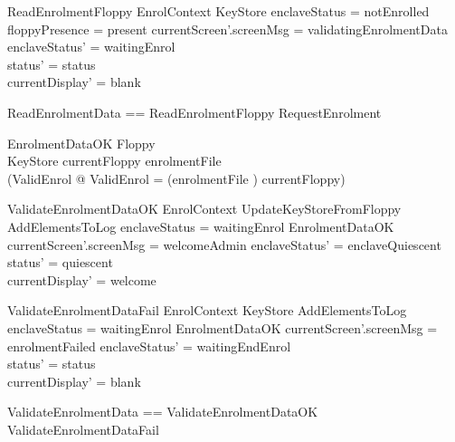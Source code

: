 \begin{schema}{ReadEnrolmentFloppy}
        EnrolContext
\also
        \Xi KeyStore
\where
        enclaveStatus = notEnrolled
\\      floppyPresence = present
\also
        currentScreen'.screenMsg = validatingEnrolmentData 
\also
        enclaveStatus' = waitingEnrol     
\\      status' = status
\\      currentDisplay' = blank                         
\end{schema}

\begin{zed}
        ReadEnrolmentData == ReadEnrolmentFloppy \lor RequestEnrolment
\end{zed}

\begin{schema}{EnrolmentDataOK}
        Floppy
\\      KeyStore
\where
        currentFloppy \in \ran enrolmentFile
\\      (\exists ValidEnrol @ \theta ValidEnrol = (enrolmentFile \inv)
currentFloppy)
\end{schema}

\begin{schema}{ValidateEnrolmentDataOK}
        EnrolContext
\also
        UpdateKeyStoreFromFloppy
\\      AddElementsToLog
\where
        enclaveStatus = waitingEnrol
\also
        EnrolmentDataOK
\also
        currentScreen'.screenMsg = welcomeAdmin
\also
        enclaveStatus' = enclaveQuiescent 
\\      status' = quiescent
\\      currentDisplay' = welcome
\end{schema}

\begin{schema}{ValidateEnrolmentDataFail}
        EnrolContext
\also
        \Xi KeyStore
\also
        AddElementsToLog
\where
        enclaveStatus = waitingEnrol
\also
        \lnot EnrolmentDataOK
\also
        currentScreen'.screenMsg = enrolmentFailed
\also
        enclaveStatus' = waitingEndEnrol
\\      status' = status
\\      currentDisplay' = blank
\end{schema}

\begin{zed}
        ValidateEnrolmentData == ValidateEnrolmentDataOK \lor
          ValidateEnrolmentDataFail
\end{zed}

